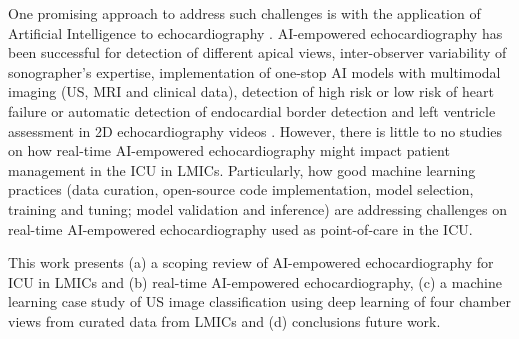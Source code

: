 \documentclass[mlabstract,twocolumn]{jmlr}
\begin{document}
One promising approach to address such challenges is with the application of Artificial Intelligence to echocardiography \citep{2022ASCH_JAmericanSocietyEchocardiography}.
AI-empowered echocardiography has been successful for detection of different apical views, inter-observer variability of sonographer's expertise, implementation of one-stop AI models with multimodal imaging (US, MRI and clinical data), detection of high risk or low risk of heart failure or automatic detection of endocardial border detection and left ventricle assessment in 2D echocardiography videos \citep{tromp2022, zhang2022-mdpi, behnami2020, ono2022}.
However, there is little to no studies on how real-time AI-empowered echocardiography might impact patient management in the ICU in LMICs.
Particularly, how good machine learning practices (data curation, open-source code implementation, model selection, training and tuning; model validation and inference) are addressing challenges on real-time AI-empowered echocardiography used as point-of-care in the ICU.

This work presents (a) a scoping review of AI-empowered echocardiography for ICU in LMICs and (b) real-time AI-empowered echocardiography, (c) a machine learning case study of US image classification using deep learning of four chamber views from curated data from LMICs and (d) conclusions future work.


\end{document}

